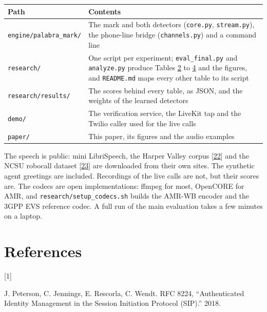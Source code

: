 \documentclass[10pt,a4paper]{article}
\begin{document}
{\def\LTcaptype{none} %
\begin{longtable}[]{@{}
  >{\raggedright\arraybackslash}p{}
  >{\raggedright\arraybackslash}p{}@{}}
\toprule\noalign{}
\begin{minipage}[b]{\linewidth}\raggedright
Path
\end{minipage} & \begin{minipage}[b]{\linewidth}\raggedright
Contents
\end{minipage} \\
\midrule\noalign{}
\endhead
\bottomrule\noalign{}
\endlastfoot
\texttt{engine/palabra\_mark/} & The mark and both detectors (\texttt{core.py}, \texttt{stream.py}), the phone-line bridge (\texttt{channels.py}) and a command line \\
\texttt{research/} & One script per experiment; \texttt{eval\_final.py} and \texttt{analyze.py} produce Tables \hyperref[t-2]{2} to \hyperref[t-4]{4} and the figures, and \texttt{README.md} maps every other table to its script \\
\texttt{research/results/} & The scores behind every table, as JSON, and the weights of the learned detectors \\
\texttt{demo/} & The verification service, the LiveKit tap and the Twilio caller used for the live calls \\
\texttt{paper/} & This paper, its figures and the audio examples \\
\end{longtable}
}

The speech is public: mini LibriSpeech, the Harper Valley corpus {[}\hyperlink{ref-22}{22}{]} and the NCSU robocall dataset {[}\hyperlink{ref-23}{23}{]} are downloaded from their own sites. The synthetic agent greetings are included. Recordings of the live calls are not, but their scores are. The codecs are open implementations: ffmpeg for most, OpenCORE for AMR, and \texttt{research/setup\_codecs.sh} builds the AMR-WB encoder and the 3GPP EVS reference codec. A full run of the main evaluation takes a few minutes on a laptop.

\section*{References}

\hypertarget{ref-1}{{[}1{]}} J. Peterson, C. Jennings, E. Rescorla, C. Wendt. RFC 8224, ``Authenticated Identity Management in the Session Initiation Protocol (SIP).'' 2018.
\end{document}
